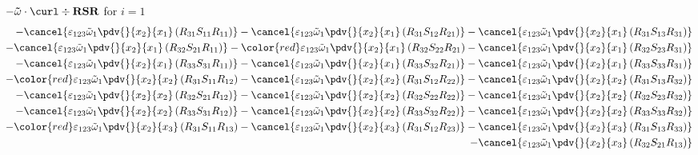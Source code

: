 $-\mathbf{\tilde{\omega}}\cdot\curl \div \mathbf{RSR}$ for $i=1$
\begin{equation}
	\begin{split}
		-\cancel{\varepsilon_{123}\tilde{\omega}_{1}\pdv{}{x_{2}}{x_{1}}\left(R_{31}S_{11}R_{11}\right)}
		-\cancel{\varepsilon_{123}\tilde{\omega}_{1}\pdv{}{x_{2}}{x_{1}}\left(R_{31}S_{12}R_{21}\right)}
		-\cancel{\varepsilon_{123}\tilde{\omega}_{1}\pdv{}{x_{2}}{x_{1}}\left(R_{31}S_{13}R_{31}\right)}\\
		-\cancel{\varepsilon_{123}\tilde{\omega}_{1}\pdv{}{x_{2}}{x_{1}}\left(R_{32}S_{21}R_{11}\right)}
		-{\color{red}\varepsilon_{123}\tilde{\omega}_{1}\pdv{}{x_{2}}{x_{1}}\left(R_{32}S_{22}R_{21}\right)}
		-\cancel{\varepsilon_{123}\tilde{\omega}_{1}\pdv{}{x_{2}}{x_{1}}\left(R_{32}S_{23}R_{31}\right)}\\
		-\cancel{\varepsilon_{123}\tilde{\omega}_{1}\pdv{}{x_{2}}{x_{1}}\left(R_{33}S_{31}R_{11}\right)}
		-\cancel{\varepsilon_{123}\tilde{\omega}_{1}\pdv{}{x_{2}}{x_{1}}\left(R_{33}S_{32}R_{21}\right)}
		-\cancel{\varepsilon_{123}\tilde{\omega}_{1}\pdv{}{x_{2}}{x_{1}}\left(R_{33}S_{33}R_{31}\right)}\\
		-{\color{red}\varepsilon_{123}\tilde{\omega}_{1}\pdv{}{x_{2}}{x_{2}}\left(R_{31}S_{11}R_{12}\right)}
		-\cancel{\varepsilon_{123}\tilde{\omega}_{1}\pdv{}{x_{2}}{x_{2}}\left(R_{31}S_{12}R_{22}\right)}
		-\cancel{\varepsilon_{123}\tilde{\omega}_{1}\pdv{}{x_{2}}{x_{2}}\left(R_{31}S_{13}R_{32}\right)}\\
		-\cancel{\varepsilon_{123}\tilde{\omega}_{1}\pdv{}{x_{2}}{x_{2}}\left(R_{32}S_{21}R_{12}\right)}
		-\cancel{\varepsilon_{123}\tilde{\omega}_{1}\pdv{}{x_{2}}{x_{2}}\left(R_{32}S_{22}R_{22}\right)}
		-\cancel{\varepsilon_{123}\tilde{\omega}_{1}\pdv{}{x_{2}}{x_{2}}\left(R_{32}S_{23}R_{32}\right)}\\
		-\cancel{\varepsilon_{123}\tilde{\omega}_{1}\pdv{}{x_{2}}{x_{2}}\left(R_{33}S_{31}R_{12}\right)}
		-\cancel{\varepsilon_{123}\tilde{\omega}_{1}\pdv{}{x_{2}}{x_{2}}\left(R_{33}S_{32}R_{22}\right)}
		-\cancel{\varepsilon_{123}\tilde{\omega}_{1}\pdv{}{x_{2}}{x_{2}}\left(R_{33}S_{33}R_{32}\right)}\\
		-{\color{red}\varepsilon_{123}\tilde{\omega}_{1}\pdv{}{x_{2}}{x_{3}}\left(R_{31}S_{11}R_{13}\right)}
		-\cancel{\varepsilon_{123}\tilde{\omega}_{1}\pdv{}{x_{2}}{x_{3}}\left(R_{31}S_{12}R_{23}\right)}
		-\cancel{\varepsilon_{123}\tilde{\omega}_{1}\pdv{}{x_{2}}{x_{3}}\left(R_{31}S_{13}R_{33}\right)}\\
		-\cancel{\varepsilon_{123}\tilde{\omega}_{1}\pdv{}{x_{2}}{x_{3}}\left(R_{32}S_{21}R_{13}\right)}

\end{split}
\end{equation}
